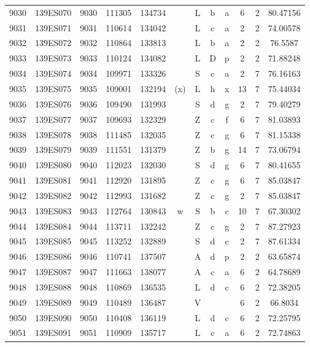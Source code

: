 \begin{tabular}{|*{12}{c|}}
9030 & 139ES070 & 9030 & 111305 & 134734 &  & L & b & a & 6 & 2 & 80.47156 \\ 
9031 & 139ES071 & 9031 & 110614 & 134042 &  & L & c & a & 2 & 2 & 74.00578 \\ 
9032 & 139ES072 & 9032 & 110864 & 133813 &  & L & b & a & 2 & 2 & 76.5587 \\ 
9033 & 139ES073 & 9033 & 110124 & 134082 &  & L & D & p & 2 & 2 & 71.88248 \\ 
9034 & 139ES074 & 9034 & 109971 & 133326 &  & S & c & a & 2 & 7 & 76.16163 \\ 
9035 & 139ES075 & 9035 & 109001 & 132194 & (x) & L & h & x & 13 & 7 & 75.44034 \\ 
9036 & 139ES076 & 9036 & 109490 & 131993 &  & S & d & g & 2 & 7 & 79.40279 \\ 
9037 & 139ES077 & 9037 & 109693 & 132329 &  & Z & c & f & 6 & 7 & 81.03893 \\ 
9038 & 139ES078 & 9038 & 111485 & 132035 &  & Z & c & g & 6 & 7 & 81.15338 \\ 
9039 & 139ES079 & 9039 & 111551 & 131379 &  & Z & b & g & 14 & 7 & 73.06794 \\ 
9040 & 139ES080 & 9040 & 112023 & 132030 &  & S & d & g & 6 & 7 & 80.41655 \\ 
9041 & 139ES081 & 9041 & 112920 & 131895 &  & Z & c & g & 6 & 7 & 85.03847 \\ 
9042 & 139ES082 & 9042 & 112993 & 131682 &  & Z & c & g & 2 & 7 & 85.03847 \\ 
9043 & 139ES083 & 9043 & 112764 & 130843 & w & S & b & c & 10 & 7 & 67.30302 \\ 
9044 & 139ES084 & 9044 & 113711 & 132242 &  & Z & c & g & 2 & 7 & 87.27923 \\ 
9045 & 139ES085 & 9045 & 113252 & 132889 &  & S & d & c & 2 & 7 & 87.61334 \\ 
9046 & 139ES086 & 9046 & 110741 & 137507 &  & A & d & p & 2 & 2 & 63.65874 \\ 
9047 & 139ES087 & 9047 & 111663 & 138077 &  & A & c & a & 6 & 2 & 64.78689 \\ 
9048 & 139ES088 & 9048 & 110869 & 136535 &  & L & d & c & 6 & 2 & 72.38205 \\ 
9049 & 139ES089 & 9049 & 110489 & 136487 &  & V &  &  & 6 & 2 & 66.8034 \\ 
9050 & 139ES090 & 9050 & 110408 & 136119 &  & L & d & c & 6 & 2 & 72.25795 \\ 
9051 & 139ES091 & 9051 & 110909 & 135717 &  & L & c & a & 6 & 2 & 72.74863 \\ 

\end{tabular}
